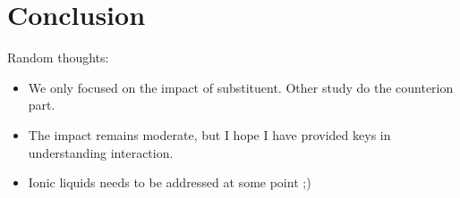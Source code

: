 \documentclass[review]{elsarticle}
\begin{document}
\clearpage
\section{Conclusion} \label{sec:conclusion}

Random thoughts:\begin{itemize}
	\item We only focused on the impact of substituent. Other study do the counterion part.
	\item The impact remains moderate, but I hope I have provided keys in understanding interaction.
	\item Ionic liquids needs to be addressed at some point ;)
\end{itemize}
	
	
 

	
\end{document}
